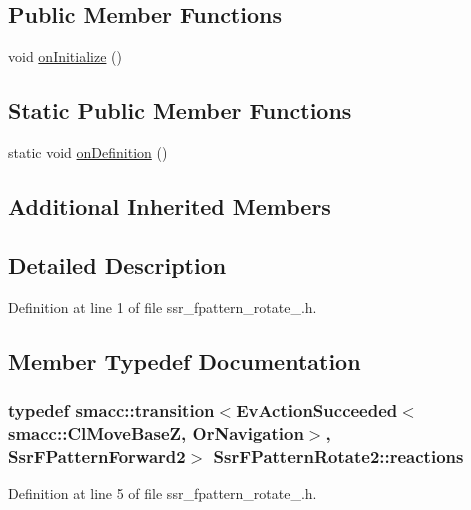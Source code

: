 \subsection*{Public Member Functions}
\begin{DoxyCompactItemize}
\item 
void \hyperlink{structSsrFPatternRotate2_af062537a9565259e197c1241c9c9d9b0}{on\+Initialize} ()
\end{DoxyCompactItemize}
\subsection*{Static Public Member Functions}
\begin{DoxyCompactItemize}
\item 
static void \hyperlink{structSsrFPatternRotate2_a4140f75a6189da0833fd5e6100c5193d}{on\+Definition} ()
\end{DoxyCompactItemize}
\subsection*{Additional Inherited Members}


\subsection{Detailed Description}


Definition at line 1 of file ssr\+\_\+fpattern\+\_\+rotate\+\_.\+h.



\subsection{Member Typedef Documentation}
\subsubsection[{\texorpdfstring{reactions}{reactions}}]{\setlength{\rightskip}{0pt plus 5cm}typedef {\bf smacc\+::transition}$<$Ev\+Action\+Succeeded$<${\bf smacc\+::\+Cl\+Move\+BaseZ}, {\bf Or\+Navigation}$>$, {\bf Ssr\+F\+Pattern\+Forward2}$>$ {\bf Ssr\+F\+Pattern\+Rotate2\+::reactions}}\hypertarget{structSsrFPatternRotate2_a7415aa59cf273cef36f62fe1a796bb48}{}\label{structSsrFPatternRotate2_a7415aa59cf273cef36f62fe1a796bb48}


Definition at line 5 of file ssr\+\_\+fpattern\+\_\+rotate\+\_.\+h.



